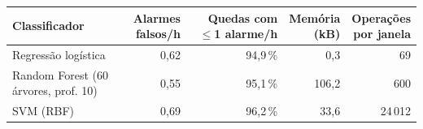 \begin{tabular}{@{}lrrrr@{}}
\toprule
Classificador & \makecell[r]{Alarmes\\falsos/h} & \makecell[r]{Quedas com\\$\le$1 alarme/h} & \makecell[r]{Memória\\(kB)} & \makecell[r]{Operações\\por janela} \\
\midrule
Regressão logística & 0,62 & 94,9\,\% & 0,3 & 69 \\
Random Forest (60 árvores, prof. 10) & 0,55 & 95,1\,\% & 106,2 & 600 \\
SVM (RBF) & 0,69 & 96,2\,\% & 33,6 & 24\,012 \\
\bottomrule
\end{tabular}
